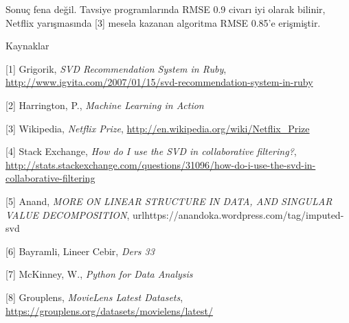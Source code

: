 \documentclass[12pt,fleqn]{article}\usepackage{../../common}
\begin{document}
Sonuç fena değil. Tavsiye programlarında RMSE 0.9 civarı iyi olarak
bilinir, Netflix yarışmasında [3] mesela kazanan algoritma RMSE 0.85'e
erişmiştir.

Kaynaklar

[1] Grigorik, {\em SVD Recommendation System in Ruby}, \url{http://www.igvita.com/2007/01/15/svd-recommendation-system-in-ruby}

[2] Harrington, P., {\em Machine Learning in Action}

[3] Wikipedia, {\em Netflix Prize}, \url{http://en.wikipedia.org/wiki/Netflix_Prize}

[4] Stack Exchange, {\em How do I use the SVD in collaborative filtering?}, \url{http://stats.stackexchange.com/questions/31096/how-do-i-use-the-svd-in-collaborative-filtering}

[5] Anand, {\em MORE ON LINEAR STRUCTURE IN DATA, AND SINGULAR VALUE
  DECOMPOSITION}, url{https://anandoka.wordpress.com/tag/imputed-svd}

[6] Bayramli, Lineer Cebir, {\em Ders 33}

[7] McKinney, W., {\em Python for Data Analysis}

[8] Grouplens, {\em MovieLens Latest Datasets},
    \url{https://grouplens.org/datasets/movielens/latest/}
\end{document}
